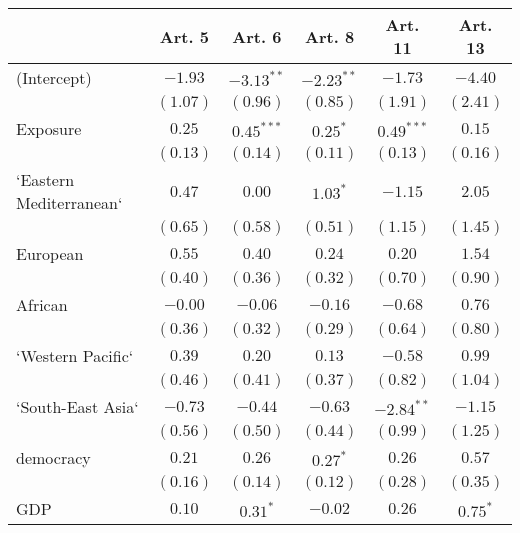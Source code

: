 
\begin{table}[!h]
\begin{center}
\begin{tabular}{l c c c c c }
\toprule
 & Art. 5 & Art. 6 & Art. 8 & Art. 11 & Art. 13 \\
\midrule
(Intercept)             & $-1.93$      & $-3.13^{**}$ & $-2.23^{**}$ & $-1.73$      & $-4.40$      \\
                        & $(1.07)$     & $(0.96)$     & $(0.85)$     & $(1.91)$     & $(2.41)$     \\
Exposure                & $0.25$       & $0.45^{***}$ & $0.25^{*}$   & $0.49^{***}$ & $0.15$       \\
                        & $(0.13)$     & $(0.14)$     & $(0.11)$     & $(0.13)$     & $(0.16)$     \\
`Eastern Mediterranean` & $0.47$       & $0.00$       & $1.03^{*}$   & $-1.15$      & $2.05$       \\
                        & $(0.65)$     & $(0.58)$     & $(0.51)$     & $(1.15)$     & $(1.45)$     \\
European                & $0.55$       & $0.40$       & $0.24$       & $0.20$       & $1.54$       \\
                        & $(0.40)$     & $(0.36)$     & $(0.32)$     & $(0.70)$     & $(0.90)$     \\
African                 & $-0.00$      & $-0.06$      & $-0.16$      & $-0.68$      & $0.76$       \\
                        & $(0.36)$     & $(0.32)$     & $(0.29)$     & $(0.64)$     & $(0.80)$     \\
`Western Pacific`       & $0.39$       & $0.20$       & $0.13$       & $-0.58$      & $0.99$       \\
                        & $(0.46)$     & $(0.41)$     & $(0.37)$     & $(0.82)$     & $(1.04)$     \\
`South-East Asia`       & $-0.73$      & $-0.44$      & $-0.63$      & $-2.84^{**}$ & $-1.15$      \\
                        & $(0.56)$     & $(0.50)$     & $(0.44)$     & $(0.99)$     & $(1.25)$     \\
democracy               & $0.21$       & $0.26$       & $0.27^{*}$   & $0.26$       & $0.57$       \\
                        & $(0.16)$     & $(0.14)$     & $(0.12)$     & $(0.28)$     & $(0.35)$     \\
GDP                     & $0.10$       & $0.31^{*}$   & $-0.02$      & $0.26$       & $0.75^{*}$   \\

\end{tabular}
\end{center}
\end{table}
